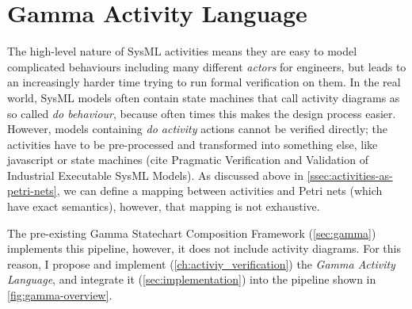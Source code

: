 \chapter{Gamma Activity Language}\label{sec:gamma-activity-language}

The high-level nature of SysML activities means they are easy to model complicated behaviours including many different \emph{actors} for engineers, but leads to an increasingly harder time trying to run formal verification on them. In the real world, SysML models often contain state machines that call activity diagrams as so called \emph{do behaviour}, because often times this makes the design process easier. However, models containing \emph{do activity} actions cannot be verified directly; the activities have to be pre-processed and transformed into something else, like javascript or state machines (cite Pragmatic Verification and Validation of Industrial Executable SysML Models). As discussed above in \autoref{ssec:activities-as-petri-nets}, we can define a mapping between activities and Petri nets (which have exact semantics), however, that mapping is not exhaustive.

The pre-existing Gamma Statechart Composition Framework (\autoref{sec:gamma}) implements this pipeline, however, it does not include activity diagrams. For this reason, I propose and implement (\autoref{ch:activiy_verification}) the \emph{Gamma Activity Language}, and integrate it (\autoref{sec:implementation}) into the pipeline shown in \autoref{fig:gamma-overview}.




